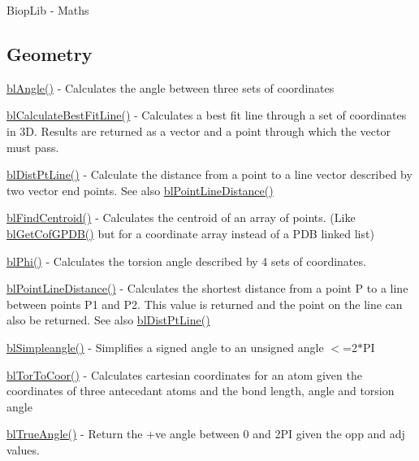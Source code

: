 Biop\-Lib -\/ Maths

\subsection*{Geometry }


\begin{DoxyItemize}
\item \hyperlink{angle_8c_a15d42fd7c62e6437ea948e4f4368aa8a}{bl\-Angle()} -\/ Calculates the angle between three sets of coordinates
\item \hyperlink{regression_8c_a2ab38f6c853b731625078307cc54c8b1}{bl\-Calculate\-Best\-Fit\-Line()} -\/ Calculates a best fit line through a set of coordinates in 3\-D. Results are returned as a vector and a point through which the vector must pass.
\item \hyperlink{_dist_pt_line_8c_a5fecc1af047d8c84e295d8ac3c60ec05}{bl\-Dist\-Pt\-Line()} -\/ Calculate the distance from a point to a line vector described by two vector end points. See also \hyperlink{_math_util_8h_aa79ffe75bcb856281d385996098de754}{bl\-Point\-Line\-Distance()}
\item \hyperlink{regression_8c_a2979a35841ba3c78d55aae8cb0ef7641}{bl\-Find\-Centroid()} -\/ Calculates the centroid of an array of points. (Like \hyperlink{_get_c_g_p_d_b_8c_a8044f4c9cc4e72b145b22fb6aa7cff96}{bl\-Get\-Cof\-G\-P\-D\-B()} but for a coordinate array instead of a P\-D\-B linked list)
\item \hyperlink{angle_8h_a87538c775599e78844390780df3b0653}{bl\-Phi()} -\/ Calculates the torsion angle described by 4 sets of coordinates.
\item \hyperlink{_math_util_8h_aa79ffe75bcb856281d385996098de754}{bl\-Point\-Line\-Distance()} -\/ Calculates the shortest distance from a point P to a line between points P1 and P2. This value is returned and the point on the line can also be returned. See also \hyperlink{_dist_pt_line_8c_a5fecc1af047d8c84e295d8ac3c60ec05}{bl\-Dist\-Pt\-Line()}
\item \hyperlink{angle_8h_ad658cd317108e2cf29326fa689fb8ec3}{bl\-Simpleangle()} -\/ Simplifies a signed angle to an unsigned angle $<$=2$\ast$\-P\-I
\item \hyperlink{angle_8h_a902829b1c25ea3681486c1ede42846b6}{bl\-Tor\-To\-Coor()} -\/ Calculates cartesian coordinates for an atom given the coordinates of three antecedant atoms and the bond length, angle and torsion angle
\item \hyperlink{angle_8h_a5828e7459715c9b8382e7ee19cd43b54}{bl\-True\-Angle()} -\/ Return the +ve angle between 0 and 2\-P\-I given the opp and adj values.
\end{DoxyItemize}

